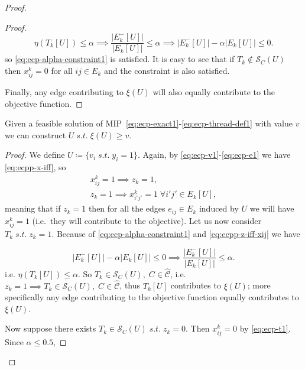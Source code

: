 \begin{proof}
\begin{proof}
		\begin{equation}
			\eta(T_k[U]) \leq \alpha \implies \frac{|E^{-}_{k}[U]|}{|E_{k}[U]|} \leq
			\alpha \implies |E^{-}_{k}[U]| - \alpha |E_{k}[U]| \leq 0.
		\end{equation}
		so \eqref{eq:ecp-alpha-constraint1} is satisfied. It is easy to see that
		if $T_k \not\in \mathcal{S}_C(U)$ then $x_{ij}^{k} = 0$ for all $ij \in E_{k}$ and
		the constraint is also satisfied.

		Finally, any edge contributing to $\xi(U)$ will also
		equally contribute to the objective function.
	\end{proof}

	\begin{claim}
		\label{th:claim-xi-b-v}
		Given a feasible solution of
		MIP~\eqref{eq:ecp-exact1}-\eqref{eq:ecp-thread-def1} with value $v$ we can
		construct $U \; s.t. \; \xi(U) \geq v$.
	\end{claim}

	\begin{proof}
		We define $U \coloneqq \{ v_{i} \; s.t. \; y_i = 1\}$. Again, by
		\eqref{eq:ecp-v1}-\eqref{eq:ecp-e1} we have
		\eqref{eq:ecpp-x-iff}, so
		\begin{gather}
			x_{ij}^{k} = 1 \implies z_k = 1, \\
			\label{eq:ecpp-z-iff-xij}
			z_k = 1 \implies x_{i'j'}^{k} = 1 \; \forall i'j'
			\in E_k[U],
		\end{gather}
		meaning that if $z_k = 1$ then for all the edges $e_{ij} \in E_k$ induced
		by $U$ we will have $x_{ij}^{k} = 1$ (i.e.\ they will contribute to the
		objective).
		Let us now consider $T_k \; s.t. \; z_k = 1$. Because of
		\eqref{eq:ecp-alpha-constraint1} and \eqref{eq:ecpp-z-iff-xij} we have

		\begin{equation}
			\label{eq:ecpp-nc-t}
			|E^{-}_{k}[U]| - \alpha |E_{k}[U]| \leq 0 \implies
			\frac{|E^{-}_{k}[U]|}{|E_{k}[U]|} \leq \alpha.
		\end{equation}
		i.e. $\eta(T_k[U]) \leq \alpha$. So $T_k \in
			\mathcal{S}_C(U), \; C \in \mathcal{\hat{C}}$, i.e. $z_k = 1 \implies T_k
			\in \mathcal{S}_C(U), \; C \in \mathcal{\hat{C}}$, thus $T_k[U]$ contributes to
		$\xi(U)$; more specifically any edge contributing to the objective function equally
		contributes to $\xi(U)$.

		Now suppose there exists $T_k \in \mathcal{S}_C(U) \; s.t.
			\; z_k = 0$. Then $ x_{ij}^{k} = 0$ by \eqref{eq:ecp-t1}. Since $\alpha \leq 0.5$,


\end{proof}
\end{proof}
